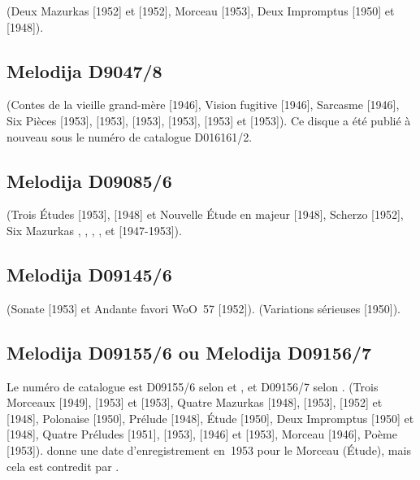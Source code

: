 \Scriabine{} (Deux Mazurkas   [1952] et 
 [1952], Morceau   [1953], Deux Impromptus
  [1950] et   [1948]).

\subsection{Melodija D9047/8}

\Prokofiev{} (Contes de la vieille grand-mère  [1946], Vision
fugitive   [1946], Sarcasme   [1946],
Six Pièces   [1953],   [1953],
  [1953],   [1953], 
 [1953] et   [1953]).
Ce disque a été publié à nouveau sous le numéro de catalogue D016161/2.

\subsection{Melodija D09085/6}

\Chopin{} (Trois Études   [1953],  
[1948] et Nouvelle Étude  en \kA \Flat majeur [1948], Scherzo
 [1952], Six Mazurkas  ,  ,
 ,  ,   et
  [1947-1953]).

\subsection{Melodija D09145/6}

\Beethoven{} (Sonate  [1953] et Andante favori WoO~57 [1952]).
\Mendelssohn{} (Variations sérieuses  [1950]).

\subsection{Melodija D09155/6 ou Melodija D09156/7}

Le numéro de catalogue est D09155/6 selon \citet{Nikonovich11} et
\citet{White}, et D09156/7 selon \citet{Masuda}.
\Scriabine{} (Trois Morceaux   [1949],  
[1953] et   [1953], Quatre Mazurkas  
[1948],   [1953],   [1952] et
  [1948], Polonaise  [1950], Prélude 
 [1948], Étude   [1950], Deux Impromptus
  [1950] et   [1948], Quatre Préludes
  [1951],   [1953], 
 [1946] et   [1953], Morceau 
 [1946], Poème   [1953]).
\INikonovich{} \citep[voir][p.~2]{Nikonovich11} donne une date
d'enregistrement en~1953 pour le Morceau   (Étude), mais
cela est contredit par \FMalik{} \citep[voir][p.~72]{Malik}.

